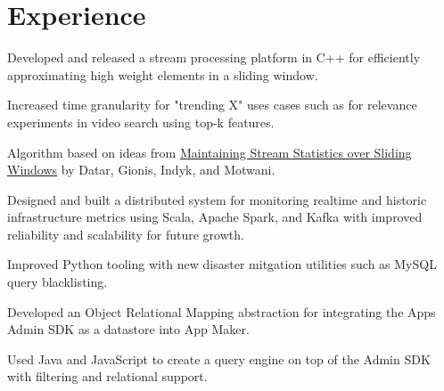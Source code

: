\documentclass[]{resume}
\begin{document}
\begin{minipage}[t]{0.66\textwidth}


\section{Experience}

\vspace{\topsep} %
\begin{tightemize}
\item Developed and released a stream processing platform in C++ for efficiently
approximating high weight elements in a sliding window.
\item Increased time granularity for "trending X" uses cases such as for relevance
experiments in video search using top-k features.
\item Algorithm based on ideas from
\href{http://www-cs-students.stanford.edu/~datar/papers/sicomp_streams.pdf}
{Maintaining Stream Statistics over Sliding Windows} by Datar, Gionis, Indyk, and Motwani.
\end{tightemize}
\sectionsep

\begin{tightemize}
\item Designed and built a distributed system for monitoring realtime and historic
infrastructure metrics using Scala, Apache Spark, and Kafka with improved reliability
and scalability for future growth.
\item Improved Python tooling with new disaster mitgation utilities such as MySQL query 
blacklisting.
\end{tightemize}
\sectionsep

\begin{tightemize}
\item Developed an Object Relational Mapping abstraction for integrating the Apps
Admin SDK as a datastore into App Maker.
\item Used Java and JavaScript to create a query engine on top of the Admin SDK with
filtering and relational support.
\end{tightemize}
\sectionsep


\end{minipage}
\end{document}
